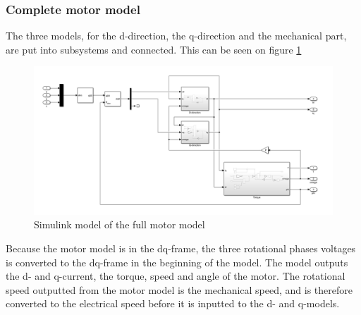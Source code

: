 \subsubsection{Complete motor model}
The three models, for the d-direction, the q-direction and the mechanical part, are put into subsystems and connected. This can be seen on figure \ref{fig:motor}

\begin{figure}[H]
	\centering
	\includegraphics[width=1\linewidth]{pictures/control/motor_model.PNG}
	\caption{Simulink model of the full motor model}
	\label{fig:motor}
\end{figure}

Because the motor model is in the dq-frame, the three rotational phases voltages is converted to the dq-frame in the beginning of the model. The model outputs the d- and q-current, the torque, speed and angle of the motor. The rotational speed outputted from the motor model is the mechanical speed, and is therefore converted to the electrical speed before it is inputted to the d- and q-models. 